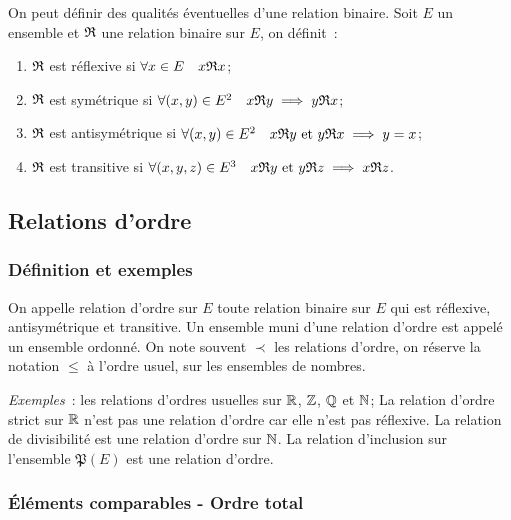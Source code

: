 \begin{defdef}
  On peut définir des qualités éventuelles d'une relation binaire. Soit \(E\) 
  un ensemble et \(\mathfrak{R}{}\) une relation binaire sur \(E\), on définit~:
  \begin{enumerate}
    \item \(\mathfrak{R}{}\) est réflexive si \(\forall x \in E \quad 
      x\mathfrak{R}{}x\);
    \item \(\mathfrak{R}{}\) est symétrique si \(\forall (x,y) \in E^2 \quad 
      x\mathfrak{R}{}y \implies y\mathfrak{R}{}x\);
    \item \(\mathfrak{R}{}\) est antisymétrique si \(\forall (x,y) \in E^2 \quad 
      x\mathfrak{R}{}y \text{~et~} y\mathfrak{R}{}x \implies y = x\);
    \item \(\mathfrak{R}{}\) est transitive si \(\forall (x,y,z) \in E^3 \quad 
      x\mathfrak{R}{}y \text{~et~} y\mathfrak{R}{}z \implies x\mathfrak{R}{}z\).
  \end{enumerate}
\end{defdef}

\subsection{Relations d'ordre}
\label{chap3-subsec:relationdordre}

\subsubsection{Définition et exemples}
\label{chap3-subsubsec:relationordredef}

\begin{defdef}
  On appelle relation d'ordre sur \(E\) toute relation binaire sur \(E\) qui 
  est réflexive, antisymétrique et transitive. Un ensemble muni d'une relation 
  d'ordre est appelé un ensemble ordonné. On note souvent \(\prec\) les 
  relations d'ordre, on réserve la notation \(\leqslant\) à l'ordre usuel, sur 
  les ensembles de nombres.
\end{defdef}

\emph{Exemples}~: les relations d'ordres usuelles sur \(\mathbb{R}\), \(\mathbb{Z}\), \(\mathbb{Q}\) et 
\(\mathbb{N}\); La relation d'ordre strict sur \(\mathbb{R}\) n'est pas une relation d'ordre car 
elle n'est pas réflexive. La relation de divisibilité est une relation d'ordre 
sur \(\mathbb{N}\). La relation d'inclusion sur l'ensemble \(\mathfrak{P}(E)\) est une 
relation d'ordre.

\subsubsection{Éléments comparables - Ordre total}
\label{chap3-subsubsec:ordretotal}

